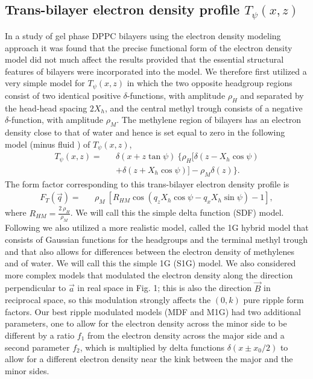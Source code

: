 \subsection{Trans-bilayer electron density profile $T_{\psi}(x,z)$}

In a study of gel phase DPPC bilayers using the electron
density modeling approach \cite{WSN89} it was found
that the precise functional form of the electron density model did not
much affect the results provided that the essential structural
features of bilayers were incorporated into the model.
We therefore first utilized a very simple model for $T_{\psi}(x,z)$ in
which the two opposite headgroup regions consist of
two identical positive $\delta$-functions, with amplitude $\rho_H$ and separated
by the head-head spacing $2X_h$, and
the central methyl trough consists of a negative $\delta$-function, with amplitude
$\rho_M$.  The methylene region of bilayers has an electron density
close to that of water and hence is set equal to zero in the
following model (minus fluid \cite{WKMc73}) of $T_{\psi}(x,z)$,
\begin{eqnarray}
\label{transbi}
T_{\psi}(x,z) =&& \delta (x + z \tan \psi)\ \{ \rho_H 
	[\delta (z-X_h\cos \psi) \nonumber\\
&& +\delta (z+X_h \cos \psi)]-\rho_M \delta (z) \}.
\end{eqnarray}
The form factor corresponding to this trans-bilayer electron density profile is
\begin{eqnarray}
\label{form_trans}
F_T (\vec{q}) =&& \rho_M\ [R_{HM} \cos (q_z X_h \cos \psi - 
q_x X_h \sin \psi) -1],
\end{eqnarray}
where \(R_{HM} = \frac{2\ \rho_H}{ \rho_M}\).   We will call this the
simple delta function (SDF) model.
Following \cite{WSN89} we also utilized a more realistic model, called the 1G 
hybrid model that consists of Gaussian functions for the headgroups and
the terminal methyl trough and that also allows for differences between the electron
density of methylenes and of water.  We will call this the simple 1G (S1G) model.
We also considered more complex models that modulated the electron density
along the direction perpendicular to $\vec{a}$ in real space in Fig. 1; this is
also the direction $\vec{B}$ in reciprocal space, so this modulation strongly
affects the $(0,k)$ pure ripple form factors.  Our best ripple modulated 
models (MDF and M1G) had two additional parameters, one to allow for the 
electron density across the minor side to be different by a ratio $f_1$
from the electron density across the major side and a second parameter
$f_2$, which is multiplied by delta functions ${\delta}(x \pm x_0/2)$ to 
allow for a
different electron density near the kink between the major and the minor sides.

